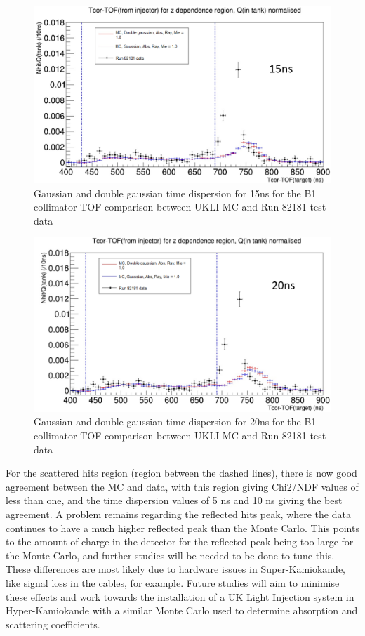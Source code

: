 \begin{figure}
    \centering
    \includegraphics[width=\textwidth]{Figures/time_dispersion_TOF_15ns.PNG}
    \caption{Gaussian and double gaussian time dispersion for 15ns for the B1 collimator TOF comparison between UKLI MC and Run 82181 test data}
    \label{fig:15ns_time_dispersion}
\end{figure}

\begin{figure}
    \centering
    \includegraphics[width=\textwidth]{Figures/time_dispersion_TOF_20ns.PNG}
    \caption{Gaussian and double gaussian time dispersion for 20ns for the B1 collimator TOF comparison between UKLI MC and Run 82181 test data}
    \label{fig:20ns_time_dispersion}
\end{figure}



For the scattered hits region (region between the dashed lines), there is now good agreement between the MC and data, with this region giving Chi2/NDF values of less than one, and the time dispersion values of 5 ns and 10 ns giving the best agreement. A problem remains regarding the reflected hits peak, where the data continues to have a much higher reflected peak than the Monte Carlo. This points to the amount of charge in the detector for the reflected peak being too large for the Monte Carlo, and further studies will be needed to be done to tune this. These differences are most likely due to hardware issues in Super-Kamiokande, like signal loss in the cables, for example. Future studies will aim to minimise these effects and work towards the installation of a UK Light Injection system in Hyper-Kamiokande with a similar Monte Carlo used to determine absorption and scattering coefficients. 


